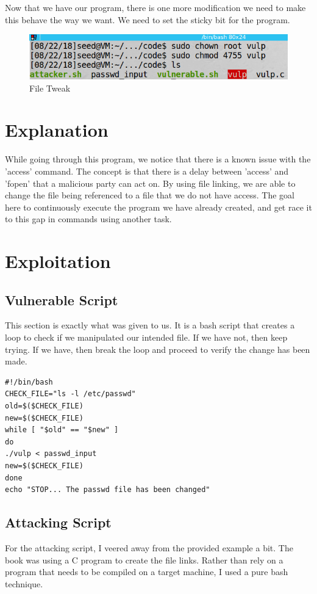 \documentclass[10pt]{article}
\begin{document}
Now that we have our program, there is one more modification we need to make this behave the way we want.  We need to set the sticky bit for the program.

\begin{figure}[H]
\centering
\includegraphics[scale=0.5]{./images/ss02.png}
\caption{File Tweak}
\label{fig:Code}
\end{figure}

\section{Explanation}
While going through this program, we notice that there is a known issue with the 'access' command.  The concept is that there is a delay between 'access' and 'fopen' that a malicious party can act on.  By using file linking, we are able to change the file being referenced to a file that we do not have access.  The goal here to continuously execute the program we have already created, and get race it to this gap in commands using another task.

\section{Exploitation}
\subsection{Vulnerable Script}
This section is exactly what was given to us.  It is a bash script that creates a loop to check if we manipulated our intended file.  If we have not, then keep trying.  If we have, then break the loop and proceed to verify the change has been made.

\begin{verbatim}
#!/bin/bash
CHECK_FILE="ls -l /etc/passwd"
old=$($CHECK_FILE)
new=$($CHECK_FILE)
while [ "$old" == "$new" ]
do
./vulp < passwd_input
new=$($CHECK_FILE)
done
echo "STOP... The passwd file has been changed"
\end{verbatim}

\subsection{Attacking Script}
For the attacking script, I veered away from the provided example a bit.  The book was using a C program to create the file links.  Rather than rely on a program that needs to be compiled on a target machine, I used a pure bash technique.
\end{document}
